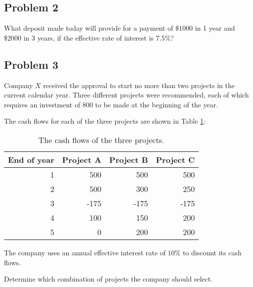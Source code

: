\documentclass[
]{book}
\begin{document}
\hypertarget{problem-2}{%
\subsection*{Problem 2}\label{problem-2}}

What deposit made today will provide for a payment of \(\$1000\) in 1 year and \(\$2000\) in 3 years, if the effective rate of interest is \(7.5\%\)?

\hypertarget{problem-3}{%
\subsection*{Problem 3}\label{problem-3}}

Company \(X\) received the approval to start no more than two projects in the current calendar year.
Three different projects were recommended, each of which requires an investment of 800 to be made at the beginning of the year.

The cash flows for each of the three projects are shown in Table \ref{tab:week1}:

\begin{table}

\caption{\label{tab:week1}The cash flows of the three projects.}
\centering
\begin{tabular}[t]{r|r|r|r}
\hline
End of year & Project A & Project B & Project C\\
\hline
1 & 500 & 500 & 500\\
\hline
2 & 500 & 300 & 250\\
\hline
3 & -175 & -175 & -175\\
\hline
4 & 100 & 150 & 200\\
\hline
5 & 0 & 200 & 200\\
\hline
\end{tabular}
\end{table}

The company uses an annual effective interest rate of \(10\%\) to discount its cash flows.

Determine which combination of projects the company should select.

  
\end{document}
